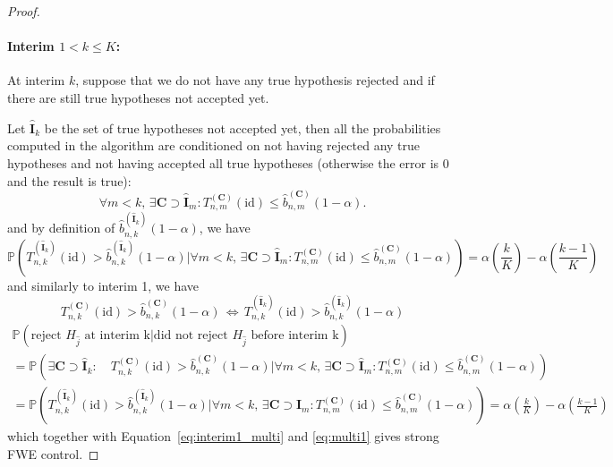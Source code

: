 \documentclass{article}
\theoremstyle{plain}
\theoremstyle{remark}
\renewcommand{\P}{\mathbb{P}}
\newcommand{\1}{\mathbbm{1}}
\newcommand{\id}{\mathrm{id}}
\numberwithin{equation}{section}
\begin{document}
\begin{proof}
\paragraph{Interim $1<k\le  K$:}

At interim $k$, suppose that we do not have any true hypothesis rejected and if there are still true hypotheses not accepted yet.

Let $\widehat{\textbf{I}}_k$ be the set of true hypotheses not accepted yet, then all the probabilities computed in the algorithm are conditioned on not having rejected any true hypotheses and not having accepted all true hypotheses (otherwise the error is $0$ and the result is true):
$$\forall m < k, \, \exists \textbf{C} \supset \widehat{\textbf{I}}_m  : T_{n,m}^{(\textbf{C})}(\id) \le \widehat{b}_{n,m}^{(\textbf{C})}(1-\alpha).$$
and by definition of $\widehat{b}_{n,k}^{(\widehat{\textbf{I}}_k)}(1-\alpha)$, we have
$$\P\left( T_{n,k}^{(\widehat{\textbf{I}}_k)}(\id)> \widehat{b}_{n,k}^{(\widehat{\textbf{I}}_k)}(1-\alpha)  \Big|\forall m < k, \, \exists \textbf{C} \supset \widehat{\textbf{I}}_m  : T_{n,m}^{(\textbf{C})}(\id) \le \widehat{b}_{n,m}^{(\textbf{C})}(1-\alpha)\right) = \alpha\left(\frac{k}{K}\right)-\alpha\left(\frac{k-1}{K}\right) $$
and similarly to interim 1, we have 
$$T_{n,k}^{(\textbf{C})}(\id)> \widehat{b}_{n,k}^{(\textbf{C})}(1-\alpha)\, \Leftrightarrow \,
 T_{n,k}^{(\widehat{\textbf{I}}_k)}(\id) > \widehat{b}_{n,k}^{(\widehat{\textbf{I}}_k)}(1-\alpha)  $$
 \begin{multline*}
\P\left(\text{reject }H_{\widehat{j}} \text{ at interim k} \Big| \text{did not reject }H_{\widehat{j}} \text{ before interim k}\right)\\
= \P\left( \exists \textbf{C} \supset \widehat{\textbf{I}}_k :\quad  T_{n,k}^{(\textbf{C})}(\id)> \widehat{b}_{n,k}^{(\textbf{C})}(1-\alpha)  \Big|  \forall m < k, \, \exists \textbf{C} \supset \widehat{\textbf{I}}_m  : T_{n,m}^{(\textbf{C})}(\id) \le \widehat{b}_{n,m}^{(\textbf{C})}(1-\alpha)\right)\\
= \P\left(T_{n,k}^{(\widehat{\textbf{I}}_k)}(\id) > \widehat{b}_{n,k}^{(\widehat{\textbf{I}}_k)}(1-\alpha)  \Big|  \forall m < k, \, \exists \textbf{C} \supset \widehat{\textbf{I}}_m  : T_{n,m}^{(\textbf{C})}(\id) \le \widehat{b}_{n,m}^{(\textbf{C})}(1-\alpha) \right)
 = \alpha\left(\frac{k}{K}\right)-\alpha\left(\frac{k-1}{K}\right)
\end{multline*}
which together with Equation~\eqref{eq:interim1_multi} and \eqref{eq:multi1} gives strong FWE control.
\end{proof}
\end{document}

